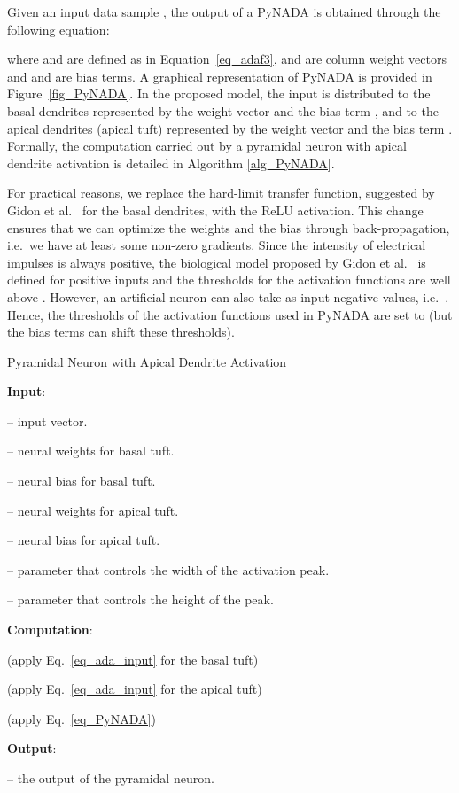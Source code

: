 \documentclass[pdflatex,sn-mathphys]{sn-jnl}
\theoremstyle{thmstyleone}
\theoremstyle{thmstyletwo}\newtheorem{example}{Example}\newtheorem{remark}{Remark}
\theoremstyle{thmstylethree}\newtheorem{definition}{Definition}\DeclareMathOperator{\sinc}{sinc}
\begin{document}
Given an input data sample , the output  of a PyNADA is obtained through the following equation:

where  and  are defined as in Equation~\eqref{eq_adaf3},  and  are column weight vectors and  and  are bias terms. A graphical representation of PyNADA is provided in Figure~\ref{fig_PyNADA}. In the proposed model, the input  is distributed to the basal dendrites represented by the weight vector  and the bias term , and to the apical dendrites (apical tuft) represented by the weight vector  and the bias term . Formally, the computation carried out by a pyramidal neuron with apical dendrite activation is detailed in Algorithm \ref{alg_PyNADA}.

For practical reasons, we replace the hard-limit transfer function, suggested by Gidon et al.~\cite{Gidon-S-2020} for the basal dendrites, with the ReLU activation. This change ensures that we can optimize the weights  and the bias  through back-propagation, i.e.~we have at least some non-zero gradients. Since the intensity of electrical impulses is always positive, the biological model proposed by Gidon et al.~\cite{Gidon-S-2020} is defined for positive inputs and the thresholds for the activation functions are well above . However, an artificial neuron can also take as input negative values, i.e.~. Hence, the thresholds of the activation functions used in PyNADA are set to  (but the bias terms can shift these thresholds).

\begin{algorithm}[!t]
\caption{Pyramidal Neuron with Apical Dendrite Activation\label{alg_PyNADA}}
\small{
\textbf{Input}: 

 -- input vector.

 -- neural weights for basal tuft.

 -- neural bias for basal tuft.

 -- neural weights for apical tuft.

 -- neural bias for apical tuft.

 -- parameter that controls the width of the activation peak.

 -- parameter that controls the height of the peak.

\textbf{Computation}:

 (apply Eq.~\eqref{eq_ada_input} for the basal tuft)

 (apply Eq.~\eqref{eq_ada_input} for the apical tuft)

 (apply Eq.~\eqref{eq_PyNADA})

\textbf{Output}: 

 -- the output of the pyramidal neuron.
}
\end{algorithm}
\end{document}

